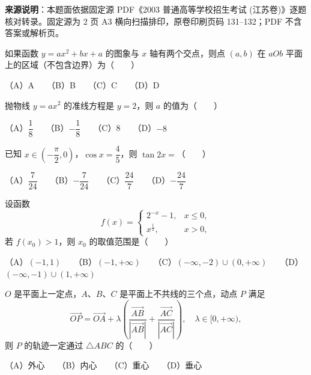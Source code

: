 

\begin{gktip}
\textbf{来源说明}：本题面依据固定源 PDF《2003 普通高等学校招生考试 (江苏卷)》逐题核对转录。固定源为 2 页 A3 横向扫描排印，原卷印刷页码 131–132；PDF 不含答案或解析页。
\end{gktip}

\Needspace{0.4\textheight}
\begin{question}
如果函数 $y = ax^2 + bx + a$ 的图象与 $x$ 轴有两个交点，则点 $(a, b)$ 在 $aOb$ 平面上的区域（不包含边界）为\mbox{（　　）}
\nopagebreak[4]
\begin{center}\end{center}
\nopagebreak[4]
（A）A　　（B）B　　（C）C　　（D）D

\end{question}
\begin{question}
抛物线 $y = ax^2$ 的准线方程是 $y = 2$，则 $a$ 的值为\mbox{（　　）}

（A）$\dfrac{1}{8}$　　（B）$-\dfrac{1}{8}$　　（C）8　　（D）$-8$

\end{question}
\begin{question}
已知 $x \in \left(-\dfrac{\pi}{2}, 0\right)$，$\cos x = \dfrac{4}{5}$，则 $\tan 2x =$\mbox{（　　）}

（A）$\dfrac{7}{24}$　　（B）$-\dfrac{7}{24}$　　（C）$\dfrac{24}{7}$　　（D）$-\dfrac{24}{7}$

\end{question}
\begin{question}
设函数
\nopagebreak[4]
\[f(x) = \begin{cases} 2^{-x} - 1, & x \le 0, \\ x^{\frac{1}{2}}, & x > 0, \end{cases}\]
若 $f(x_0) > 1$，则 $x_0$ 的取值范围是\mbox{（　　）}

（A）$(-1, 1)$　　（B）$(-1, +\infty)$　　（C）$(-\infty, -2) \cup (0, +\infty)$　　（D）$(-\infty, -1) \cup (1, +\infty)$

\end{question}
\begin{question}
$O$ 是平面上一定点，$A$、$B$、$C$ 是平面上不共线的三个点，动点 $P$ 满足
\nopagebreak[4]
\[\vec{OP} = \vec{OA} + \lambda \left(\frac{\vec{AB}}{|\vec{AB}|} + \frac{\vec{AC}}{|\vec{AC}|}\right), \quad \lambda \in [0, +\infty),\]
则 $P$ 的轨迹一定通过 $\triangle ABC$ 的\mbox{（　　）}

（A）外心　　（B）内心　　（C）重心　　（D）垂心

\end{question}
